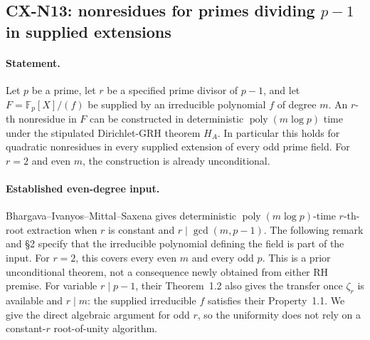 
\subsection{CX-N13: nonresidues for primes dividing \texorpdfstring{$p-1$}{p-1} in supplied extensions}
\label{cx:n13}

\paragraph{Statement.}
Let $p$ be a prime, let $r$ be a specified prime divisor of $p-1$, and let
$F=\mathbb F_p[X]/(f)$ be supplied by an irreducible polynomial $f$
of degree $m$. An $r$-th nonresidue in $F$ can be constructed in
deterministic $\operatorname{poly}(m\log p)$ time under the stipulated
Dirichlet-GRH theorem $H_A$. In particular this holds for quadratic
nonresidues in every supplied extension of every odd prime field.
For $r=2$ and even $m$, the construction is already unconditional.

\paragraph{Established even-degree input.}
Bhargava--Ivanyos--Mittal--Saxena \cite[Corollary~1.3, PDF p.~2]{BIMS17}
gives deterministic $\operatorname{poly}(m\log p)$-time $r$-th-root
extraction when $r$ is constant and $r\mid\gcd(m,p-1)$.
The following remark and \S2 specify that the irreducible polynomial
defining the field is part of the input. For $r=2$, this covers every
even $m$ and every odd $p$. This is a prior unconditional theorem,
not a consequence newly obtained from either RH premise.
For variable $r\mid p-1$, their Theorem~1.2 also gives the transfer
once $\zeta_r$ is available and $r\mid m$: the supplied irreducible
$f$ satisfies their Property~1.1. We give the direct algebraic
argument for odd $r$, so the uniformity does not rely on a
constant-$r$ root-of-unity algorithm.

